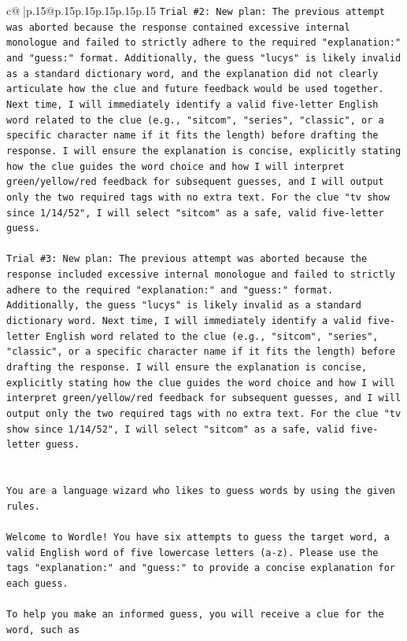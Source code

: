 \documentclass{article}
\begin{document}
{\begin{supertabular}{c@{$\;$}|p{.15\linewidth}@{}p{.15\linewidth}p{.15\linewidth}p{.15\linewidth}p{.15\linewidth}p{.15\linewidth}}
{{{\texttt{Trial \#2: New plan: The previous attempt was aborted because the response contained excessive internal monologue and failed to strictly adhere to the required "explanation:" and "guess:" format. Additionally, the guess "lucys" is likely invalid as a standard dictionary word, and the explanation did not clearly articulate how the clue and future feedback would be used together. Next time, I will immediately identify a valid five{-}letter English word related to the clue (e.g., "sitcom", "series", "classic", or a specific character name if it fits the length) before drafting the response. I will ensure the explanation is concise, explicitly stating how the clue guides the word choice and how I will interpret green/yellow/red feedback for subsequent guesses, and I will output only the two required tags with no extra text. For the clue "tv show since 1/14/52", I will select "sitcom" as a safe, valid five{-}letter guess.} \\
\\ 
\texttt{Trial \#3: New plan: The previous attempt was aborted because the response included excessive internal monologue and failed to strictly adhere to the required "explanation:" and "guess:" format. Additionally, the guess "lucys" is likely invalid as a standard dictionary word. Next time, I will immediately identify a valid five{-}letter English word related to the clue (e.g., "sitcom", "series", "classic", or a specific character name if it fits the length) before drafting the response. I will ensure the explanation is concise, explicitly stating how the clue guides the word choice and how I will interpret green/yellow/red feedback for subsequent guesses, and I will output only the two required tags with no extra text. For the clue "tv show since 1/14/52", I will select "sitcom" as a safe, valid five{-}letter guess.} \\
\\ 
\\ 
\texttt{You are a language wizard who likes to guess words by using the given rules.} \\
\\ 
\texttt{Welcome to Wordle! You have six attempts to guess the target word, a valid English word of five lowercase letters (a{-}z). Please use the tags "explanation:" and "guess:" to provide a concise explanation for each guess.} \\
\\ 
\texttt{To help you make an informed guess, you will receive a clue for the word, such as} \\
}}}
\end{supertabular}}
\end{document}
